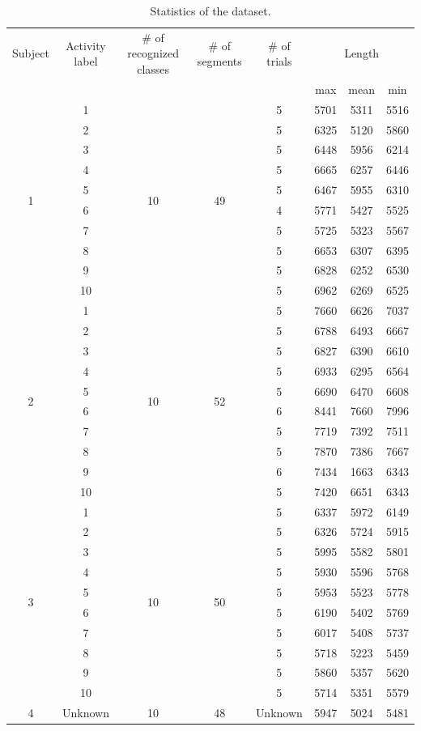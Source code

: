 \documentclass[graybox]{svmult}
\begin{document}
\begin{table}[h]
    \centering
    \caption{Statistics of the dataset.}
    \begin{tabular}{c|c|c|c|c|c|c|c}\hline\hline
    Subject & Activity label& \# of recognized classes & \# of segments & \# of trials & \multicolumn{3}{c}{Length} \\
    &&&&&max&mean&min\\\hline
    \multirow{10}{*}{1} & 1 & \multirow{10}{*}{10} & \multirow{10}{*}{49} & 5 & 5701 & 5311 & 5516\\
    & 2 & & & 5 & 6325 & 5120 & 5860\\
    & 3 & & & 5 & 6448 & 5956 & 6214\\
    & 4 & & & 5 & 6665 & 6257 & 6446\\
    & 5 & & & 5 & 6467 & 5955 & 6310\\
    & 6 & & & 4 & 5771 & 5427 & 5525\\ 
    & 7 & & & 5 & 5725 & 5323 & 5567\\ 
    & 8 & & & 5 & 6653 & 6307 & 6395\\ 
    & 9 & & & 5 & 6828 & 6252 & 6530\\
    & 10 & & & 5 &6962 & 6269 & 6525\\ \hline
    \multirow{10}{*}{2} & 1 & \multirow{10}{*}{10} & \multirow{10}{*}{52} & 5 & 7660 & 6626 & 7037\\
    & 2 & & & 5 & 6788 & 6493 & 6667\\
    & 3 & & & 5 & 6827 & 6390 & 6610\\ 
    & 4 & & & 5 & 6933 & 6295 & 6564\\
    & 5 & & & 5 & 6690 & 6470 & 6608\\
    & 6 & & & 6 & 8441 & 7660 & 7996\\
    & 7 & & & 5 & 7719 & 7392 & 7511\\
    & 8 & & & 5 & 7870 & 7386 & 7667\\ 
    & 9 & & & 6 & 7434 & 1663 & 6343\\
    & 10 & & & 5 &7420 & 6651 & 6343\\ \hline
    \multirow{10}{*}{3} & 1 & \multirow{10}{*}{10} & \multirow{10}{*}{50} & 5 & 6337 & 5972 & 6149\\
    & 2 & & & 5 & 6326 & 5724 & 5915\\
    & 3 & & & 5 & 5995 & 5582 & 5801\\
    & 4 & & & 5 & 5930 & 5596 & 5768\\
    & 5 & & & 5 & 5953 & 5523 & 5778\\
    & 6 & & & 5 & 6190 & 5402 & 5769\\
    & 7 & & & 5 & 6017 & 5408 & 5737\\ 
    & 8 & & & 5 & 5718 & 5223 & 5459\\
    & 9 & & & 5 & 5860 & 5357 & 5620\\
    & 10 & & & 5 &5714 & 5351 & 5579\\ \hline
    4 & Unknown & 10 & 48 & Unknown & 5947 & 5024 & 5481\\ \hline
    \end{tabular}
    \label{tab:stats}
\end{table}
\end{document}
